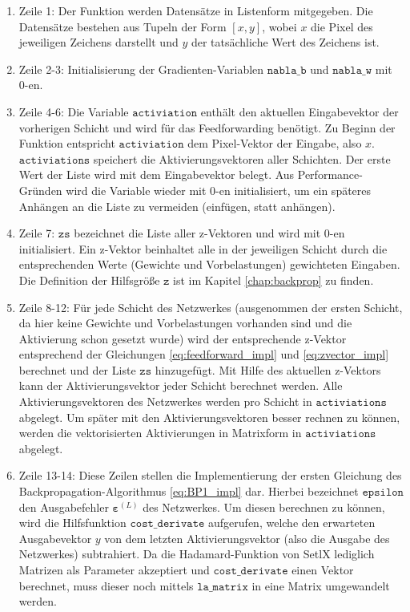 \begin{enumerate}
\item Zeile 1: Der Funktion werden Datensätze in Listenform mitgegeben. Die Datensätze bestehen aus Tupeln der Form $[x,y]$, wobei $x$ die Pixel des jeweiligen Zeichens darstellt und $y$ der tatsächliche Wert des Zeichens ist.
\item Zeile 2-3: Initialisierung der Gradienten-Variablen $\mathtt{nabla\_b}$ und $\mathtt{nabla\_w}$ mit 0-en.
\item Zeile 4-6: Die Variable $\mathtt{activiation}$ enthält den aktuellen Eingabevektor der vorherigen Schicht und wird für das Feedforwarding benötigt. Zu Beginn der Funktion entspricht $\mathtt{activiation}$ dem Pixel-Vektor der Eingabe, also $x$. $\mathtt{activiations}$ speichert die Aktivierungsvektoren aller Schichten. Der erste Wert der Liste wird mit dem Eingabevektor belegt. Aus Performance-Gründen wird die Variable wieder mit 0-en initialisiert, um ein späteres Anhängen an die Liste zu vermeiden (einfügen, statt anhängen).
\item Zeile 7: $\mathtt{zs}$ bezeichnet die Liste aller z-Vektoren und wird mit 0-en initialisiert. Ein z-Vektor beinhaltet alle in der jeweiligen Schicht durch die entsprechenden Werte (Gewichte und Vorbelastungen) gewichteten Eingaben. Die Definition der Hilfsgröße $\mathtt{z}$ ist im Kapitel \ref{chap:backprop} zu finden.
\item Zeile 8-12: Für jede Schicht des Netzwerkes (ausgenommen der ersten Schicht, da hier keine Gewichte und Vorbelastungen vorhanden sind und die Aktivierung schon gesetzt wurde) wird der entsprechende z-Vektor entsprechend der Gleichungen \eqref{eq:feedforward_impl} und \eqref{eq:zvector_impl} berechnet und der Liste $\mathtt{zs}$ hinzugefügt. Mit Hilfe des aktuellen z-Vektors kann der Aktivierungsvektor jeder Schicht berechnet werden. Alle Aktivierungsvektoren des Netzwerkes werden pro Schicht in $\mathtt{activiations}$ abgelegt. Um später mit den Aktivierungsvektoren besser rechnen zu können, werden die vektorisierten Aktivierungen in Matrixform in $\mathtt{activiations}$ abgelegt.
\item Zeile 13-14: Diese Zeilen stellen die Implementierung der ersten Gleichung des Backpropagation-Algorithmus \eqref{eq:BP1_impl} dar. Hierbei bezeichnet $\mathtt{epsilon}$ den Ausgabefehler $\boldsymbol{\varepsilon}^{(L)}$ des Netzwerkes. Um diesen berechnen zu können, wird die Hilfsfunktion $\mathtt{cost\_derivate}$ aufgerufen, welche den erwarteten Ausgabevektor $y$ von dem letzten Aktivierungsvektor (also die Ausgabe des Netzwerkes) subtrahiert. Da die Hadamard-Funktion von SetlX lediglich Matrizen als Parameter akzeptiert und $\mathtt{cost\_derivate}$ einen Vektor berechnet, muss dieser noch mittels $\mathtt{la\_matrix}$ in eine Matrix umgewandelt werden.

\end{enumerate}
